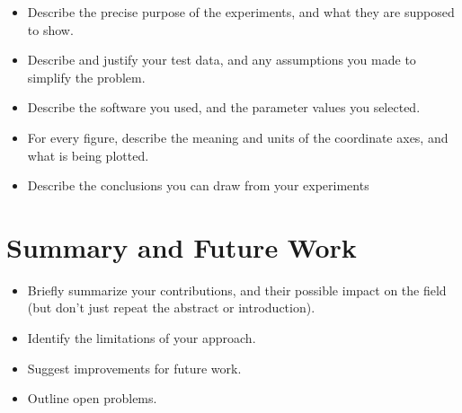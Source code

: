 \documentclass[10pt]{article}
\begin{document}
\begin{itemize}
\item Describe the precise purpose of the experiments, and what they 
are supposed to show.

\item Describe and justify your test data, and any assumptions you made to 
simplify the problem.

\item Describe the software you used, and the 
parameter values you selected.

\item 
For every figure, describe the meaning and units of the coordinate axes, 
and what is being plotted.

\item Describe the conclusions you can draw from your experiments
\end{itemize}

\section{Summary and Future Work}
\begin{itemize}
\item Briefly summarize your contributions, and their possible
impact on the field (but don't just repeat the abstract or introduction).
\item Identify the limitations of your approach.
\item Suggest improvements for future work.
\item Outline open problems.
\end{itemize}
\end{document}
